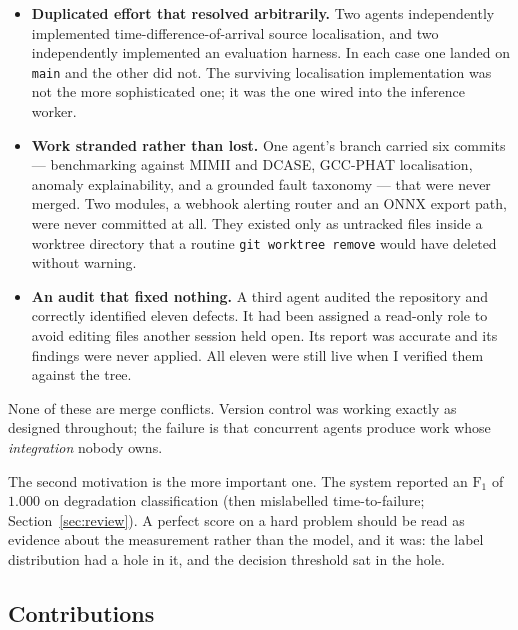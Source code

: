 \documentclass[11pt]{article}
\begin{document}
\begin{itemize}
\item \textbf{Duplicated effort that resolved arbitrarily.} Two agents
independently implemented time-difference-of-arrival source localisation, and
two independently implemented an evaluation harness. In each case one landed on
\texttt{main} and the other did not. The surviving localisation implementation
was not the more sophisticated one; it was the one wired into the inference
worker.

\item \textbf{Work stranded rather than lost.} One agent's branch carried six
commits --- benchmarking against MIMII and DCASE, GCC-PHAT localisation,
anomaly explainability, and a grounded fault taxonomy --- that were never merged.
Two modules, a webhook alerting router and an ONNX export path, were never
committed at all. They existed only as untracked files inside a worktree
directory that a routine \texttt{git worktree remove} would have deleted without
warning.

\item \textbf{An audit that fixed nothing.} A third agent audited the repository
and correctly identified eleven defects. It had been assigned a read-only role
to avoid editing files another session held open. Its report was accurate and
its findings were never applied. All eleven were still live when I verified them
against the tree.
\end{itemize}

None of these are merge conflicts. Version control was working exactly as
designed throughout; the failure is that concurrent agents produce work whose
\emph{integration} nobody owns.

The second motivation is the more important one. The system reported an
$\mathrm{F}_1$ of $1.000$ on degradation classification (then mislabelled
time-to-failure; Section~\ref{sec:review}). A perfect score on
a hard problem should be read as evidence about the measurement rather than the
model, and it was: the label distribution had a hole in it, and the decision
threshold sat in the hole.

\subsection{Contributions}
\end{document}
